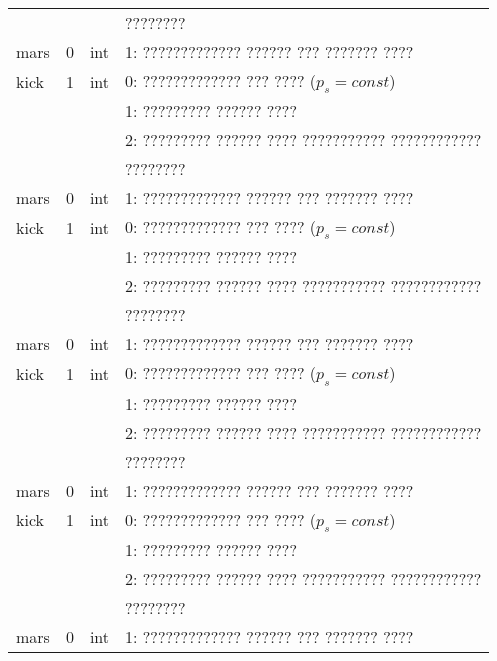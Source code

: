 \begin{longtable}[c]{|l|c|l|l|}
             &        &     & ????????                                          \\
    mars     & 0      & int & 1: ????????????? ?????? ??? ??????? ????          \\
    kick     & 1      & int & 0: ????????????? ??? ???? (\(p_s = const\))       \\
             &        &     & 1: ????????? ?????? ????                          \\
             &        &     & 2: ????????? ?????? ???? ??????????? ???????????? \\
             &        &     & ????????                                          \\
    mars     & 0      & int & 1: ????????????? ?????? ??? ??????? ????          \\
    kick     & 1      & int & 0: ????????????? ??? ???? (\(p_s = const\))       \\
             &        &     & 1: ????????? ?????? ????                          \\
             &        &     & 2: ????????? ?????? ???? ??????????? ???????????? \\
             &        &     & ????????                                          \\
    mars     & 0      & int & 1: ????????????? ?????? ??? ??????? ????          \\
    kick     & 1      & int & 0: ????????????? ??? ???? (\(p_s = const\))       \\
             &        &     & 1: ????????? ?????? ????                          \\
             &        &     & 2: ????????? ?????? ???? ??????????? ???????????? \\
             &        &     & ????????                                          \\
    mars     & 0      & int & 1: ????????????? ?????? ??? ??????? ????          \\
    kick     & 1      & int & 0: ????????????? ??? ???? (\(p_s = const\))       \\
             &        &     & 1: ????????? ?????? ????                          \\
             &        &     & 2: ????????? ?????? ???? ??????????? ???????????? \\
             &        &     & ????????                                          \\
    mars     & 0      & int & 1: ????????????? ?????? ??? ??????? ????          \\

\end{longtable}
